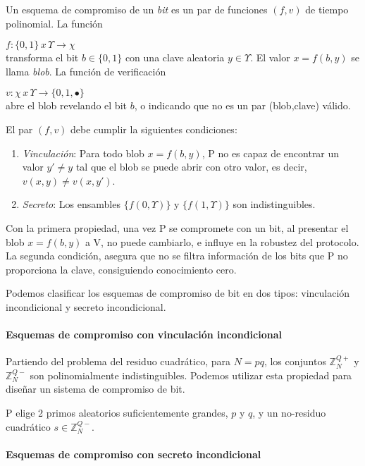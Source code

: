 \begin{definition}
	Un esquema de compromiso de un \textit{bit} es un par de funciones $(f,v)$ de tiempo polinomial. La función
	
	$
	f:\{0,1\}\, x\, \Upsilon \to \chi
	$
	\\transforma el bit $b\in \{0,1\}$ con una clave aleatoria $y\in \Upsilon$. El valor $x=f(b,y)$ se llama \textit{blob}. La función de verificación
	
	$
	v:\chi \, x \, \Upsilon \to \{0,1,\bullet\}
	$
	\\abre el blob revelando el bit $b$, o indicando que no es un par (blob,clave) válido.
	
	El par $(f,v)$ debe cumplir la siguientes condiciones:
	\begin{enumerate}
		\item \textit{Vinculación}: Para todo blob $x=f(b,y)$, P no es capaz de encontrar un valor $y' \neq y$ tal que el blob se puede abrir con otro valor, es decir, $v(x,y) \neq v(x,y')$.
		
		\item \textit{Secreto}: Los ensambles $\{f(0,\Upsilon)\}$ y $\{f(1,\Upsilon)\}$ son indistinguibles.
	\end{enumerate}
	
\end{definition}


Con la primera propiedad, una vez P se compromete con un bit, al presentar el blob  $x=f(b,y)$ a V, no puede cambiarlo, e influye en la robustez del protocolo. La segunda condición, asegura que no se filtra información de los bits que P no proporciona la clave, consiguiendo conocimiento cero.

Podemos clasificar los esquemas de compromiso de bit en dos tipos: vinculación incondicional y secreto incondicional.


\paragraph{Esquemas de compromiso con vinculación incondicional}
\hfil

Partiendo del problema del residuo cuadrático, para $N=pq$, los conjuntos $\mathbb{Z}_N^{Q+}$ y $\mathbb{Z}_N^{Q-}$ son polinomialmente indistinguibles. Podemos utilizar esta propiedad para diseñar un sistema de compromiso de bit.

P elige 2 primos aleatorios suficientemente grandes, $p$ y $q$, y un no-residuo cuadrático $s\in \mathbb{Z}_N^{Q-}$.


\paragraph{Esquemas de compromiso con secreto incondicional}
\hfil

